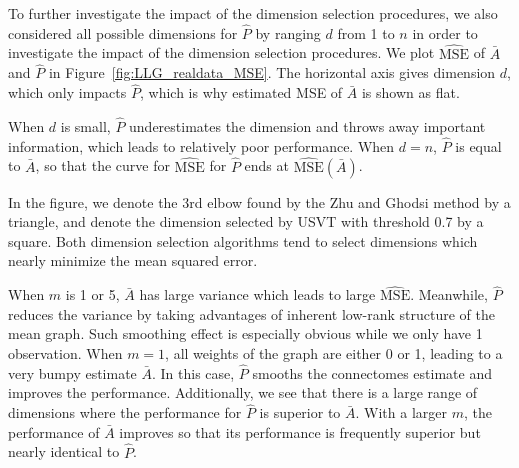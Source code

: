 To further investigate the impact of the dimension selection procedures, we also considered all possible dimensions for $\hat{P}$ by ranging $d$ from 1 to $n$ in order to investigate the impact of the dimension selection procedures.
We plot $\hat{\mathrm{MSE}}$ of $\bar{A}$ and $\hat{P}$ in Figure~\ref{fig:LLG_realdata_MSE}.
The horizontal axis gives dimension $d$, which only impacts $\hat{P}$, which is why estimated MSE of $\bar{A}$ is shown as flat.

When $d$ is small, $\hat{P}$ underestimates the dimension and throws away important information, which leads to relatively poor performance. When $d=n$, $\hat{P}$ is equal to $\bar{A}$, so that the curve for $\hat{\mathrm{MSE}}$ for $\hat{P}$ ends at $\hat{\mathrm{MSE}}(\bar{A})$. 

In the figure, we denote the 3rd elbow found by the Zhu and Ghodsi method by a triangle, and denote the dimension selected by USVT with threshold 0.7 by a square. 
Both dimension selection algorithms tend to select dimensions which nearly minimize the mean squared error.

When $m$ is 1 or 5, $\bar{A}$ has large variance which leads to large $\hat{\mathrm{MSE}}$. Meanwhile, $\hat{P}$ reduces the variance by taking advantages of inherent low-rank structure of the mean graph. Such smoothing effect is especially obvious while we only have 1 observation. When $m = 1$, all weights of the graph are either 0 or 1, leading to a very bumpy estimate $\bar{A}$. In this case, $\hat{P}$ smooths the connectomes estimate and improves the performance.
Additionally, we see that there is a large range of dimensions where the performance for $\hat{P}$ is superior to $\bar{A}$. 
With a larger $m$, the performance of $\bar{A}$ improves so that its performance is frequently superior but nearly identical to $\hat{P}$.

